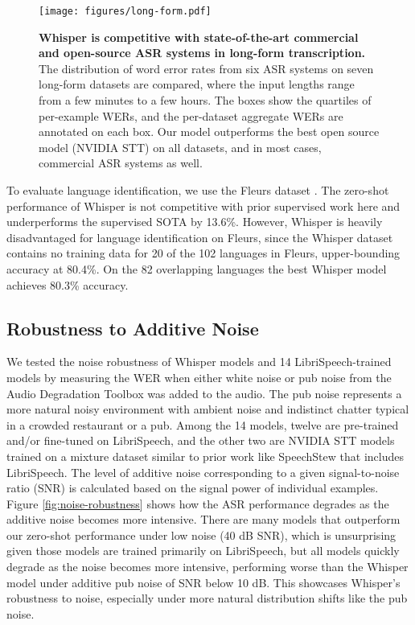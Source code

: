 \documentclass[nohyperref]{article}
\theoremstyle{plain}
\theoremstyle{definition}
\theoremstyle{remark}
\begin{document}
\begin{figure*}[b]
\begin{center}
\centerline{\texttt{[image: figures/long-form.pdf]}}
\caption{\textbf{Whisper is competitive with state-of-the-art commercial and open-source ASR systems in long-form transcription.} The distribution of word error rates from six ASR systems on seven long-form datasets are compared, where the input lengths range from a few minutes to a few hours. The boxes show the quartiles of per-example WERs, and the per-dataset aggregate WERs are annotated on each box. Our model outperforms the best open source model (NVIDIA STT) on all datasets, and in most cases, commercial ASR systems as well.}
\label{fig:long-form}
\end{center}
\vspace{-1em}
\end{figure*}



To evaluate language identification, we use the Fleurs dataset \cite{conneau2022fleurs}. The zero-shot performance of Whisper is not competitive with prior supervised work here and underperforms the supervised SOTA by 13.6\%. However, Whisper is heavily disadvantaged for language identification on Fleurs, since the Whisper dataset contains no training data for 20 of the 102 languages in Fleurs, upper-bounding accuracy at 80.4\%. On the 82 overlapping languages the best Whisper model achieves 80.3\% accuracy.


\subsection{Robustness to Additive Noise}\label{subsec:noise-robustness}

We tested the noise robustness of Whisper models and 14 LibriSpeech-trained models by measuring the WER when either white noise or pub noise from the Audio Degradation Toolbox \cite{mauch2013adt} was added to the audio. The pub noise represents a more natural noisy environment with ambient noise and indistinct chatter typical in a crowded restaurant or a pub. Among the 14 models, twelve are pre-trained and/or fine-tuned on LibriSpeech, and the other two are NVIDIA STT models trained on a mixture dataset similar to prior work like SpeechStew that includes LibriSpeech.
The level of additive noise corresponding to a given signal-to-noise ratio (SNR) is calculated based on the signal power of individual examples.
Figure \ref{fig:noise-robustness} shows how the ASR performance degrades as the additive noise becomes more intensive. There are many models that outperform our zero-shot performance under low noise (40 dB SNR), which is unsurprising given those models are trained primarily on LibriSpeech, but all models quickly degrade as the noise becomes more intensive, performing worse than the Whisper model under additive pub noise of SNR below 10 dB. This showcases Whisper's robustness to noise, especially under more natural distribution shifts like the pub noise.
\end{document}
